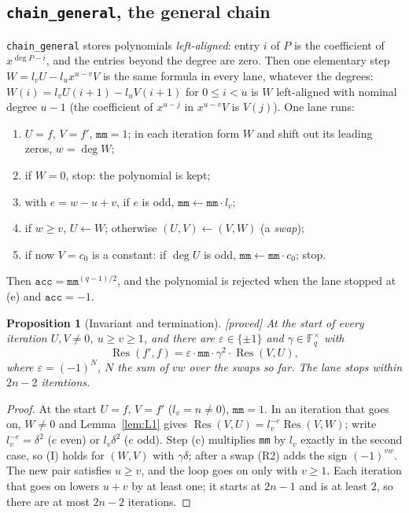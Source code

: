 \documentclass[10pt,a4paper]{article}
\newcommand{\Fq}{\mathbb{F}_q}
\DeclareMathOperator{\Res}{Res}
\newcommand{\code}[1]{\texttt{#1}}
\newcommand{\stproved}{\textsf{\small[proved]}\xspace}
\theoremstyle{plain}
\newtheorem{proposition}{Proposition}
\theoremstyle{definition}
\begin{document}
\subsection{\code{chain\_general}, the general chain}

\code{chain\_general} stores polynomials \emph{left-aligned}: entry $i$ of $P$ is the coefficient of $x^{\deg P-i}$, and the entries beyond the degree are zero.
Then one elementary step $W=l_vU-l_ux^{u-v}V$ is the same formula in every lane, whatever the degrees: $W(i)=l_vU(i+1)-l_uV(i+1)$ for $0\le i<u$ is $W$ left-aligned
with nominal degree $u-1$ (the coefficient of $x^{u-j}$ in $x^{u-v}V$ is $V(j)$).  One lane runs:
\begin{enumerate}[label=(\alph*)]
\item $U=f$, $V=f'$, $\code{mm}=1$; in each iteration form $W$ and shift out its leading zeros, $w=\deg W$;
\item if $W=0$, stop: the polynomial is kept;
\item with $e=w-u+v$, if $e$ is odd, $\code{mm}\leftarrow\code{mm}\cdot l_v$;
\item if $w\ge v$, $U\leftarrow W$; otherwise $(U,V)\leftarrow(V,W)$ (a \emph{swap});
\item if now $V=c_0$ is a constant: if $\deg U$ is odd, $\code{mm}\leftarrow\code{mm}\cdot c_0$; stop.
\end{enumerate}
Then $\code{acc}=\code{mm}^{(q-1)/2}$, and the polynomial is rejected when the lane stopped at (e) and $\code{acc}=-1$.

\begin{proposition}[Invariant and termination]\label{prop:invariant}\stproved
At the start of every iteration $U,V\neq0$, $u\ge v\ge1$, and there are $\varepsilon\in\{\pm1\}$ and $\gamma\in\Fq^\times$ with
\[ \Res(f',f)=\varepsilon\cdot\code{mm}\cdot\gamma^2\cdot\Res(V,U), \tag{I}\]
where $\varepsilon=(-1)^N$, $N$ the sum of $vw$ over the swaps so far.  The lane stops within $2n-2$ iterations.
\end{proposition}
\begin{proof}
At the start $U=f$, $V=f'$ ($l_v=n\neq0$), $\code{mm}=1$.  In an iteration that goes on, $W\neq0$ and Lemma~\ref{lem:L1} gives $\Res(V,U)=l_v^{-e}\Res(V,W)$; write
$l_v^{-e}=\delta^2$ ($e$ even) or $l_v\delta^2$ ($e$ odd).  Step (c) multiplies \code{mm} by $l_v$ exactly in the second case, so (I) holds for $(W,V)$ with
$\gamma\delta$; after a swap (R2) adds the sign $(-1)^{vw}$.  The new pair satisfies $u\ge v$, and the loop goes on only with $v\ge1$.  Each iteration that goes on
lowers $u+v$ by at least one; it starts at $2n-1$ and is at least $2$, so there are at most $2n-2$ iterations.
\end{proof}
\end{document}
